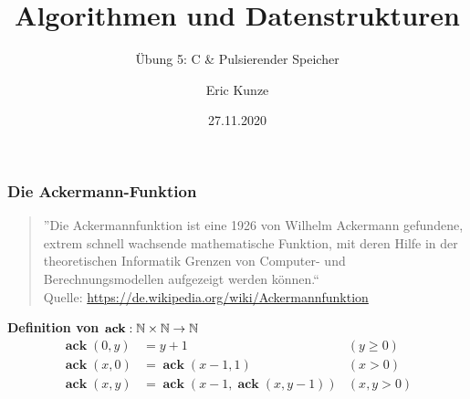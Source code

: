 \documentclass{beamer}
\DeclareMathOperator{\ack}{\mathbf{ack}}
\begin{document}
	
	\title{Algorithmen und Datenstrukturen}
	\subtitle{Übung 5: C \& Pulsierender Speicher}
	\author{Eric Kunze}
	\date{27.11.2020}

	\maketitle



\begin{frame} \frametitle{Die Ackermann-Funktion}
	\begin{quote} \small
		''Die Ackermannfunktion ist eine 1926 von Wilhelm Ackermann gefundene, extrem schnell wachsende mathematische Funktion, mit deren Hilfe in der theoretischen Informatik Grenzen von Computer- und Berechnungsmodellen aufgezeigt werden können.`` \\
		\upshape \tiny Quelle: \url{https://de.wikipedia.org/wiki/Ackermannfunktion}
	\end{quote}

	\textbf{Definition von  $\ack : \N \times \N \to \N$}
	\begin{align*}
		\ack(0,y) &= y + 1 &(y \ge 0) \\
		\ack(x,0) &= \ack(x-1,1) &(x > 0)\\
		\ack(x,y) &= \ack(x-1,\ack(x,y-1)) &(x,y > 0)
	\end{align*}
\end{frame}
\end{document}
